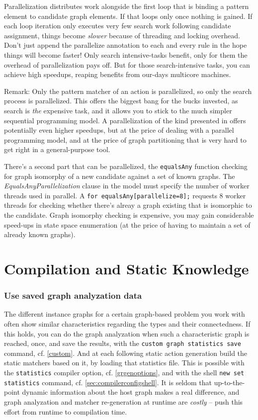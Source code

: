 Parallelization distributes work alongside the first loop that is binding a pattern element to candidate graph elements.
If that loops only once nothing is gained.
If each loop iteration only executes very few search work following candidate assignment,
things become \emph{slower} because of threading and locking overhead.
Don't just append the parallelize annotation to each and every rule in the hope things will become faster!
Only search intensive-tasks benefit, only for them the overhead of parallelization pays off.
But for those search-intensive tasks, you can achieve high speedups, reaping benefits from our-days multicore machines. 

Remark: Only the pattern matcher of an action is parallelized, so only the search process is parallelized.
This offers the biggest bang for the bucks invested, as search is \emph{the} expensive task, and it allows you to stick to the much simpler sequential programming model.
A parallelization of the kind presented in \cite{ParGraErs} offers potentially even higher speedups, but at the price of dealing with a parallel programming model, and at the price of graph partitioning that is very hard to get right in a general-purpose tool.

There's a second part that can be parallelized, the \texttt{equalsAny} function checking for graph isomorphy of a new candidate against a set of known graphs.
The \emph{EqualsAnyParallelization} clause in the model must specify the number of worker threads used in parallel.
A \verb#for equalsAny[parallelize=8];# requests 8 worker threads for checking whether there's alreay a graph existing that is isomorphic to the candidate.
Graph isomorphy checking is expensive, you may gain considerable speed-ups in state space enumeration (at the price of having to maintain a set of already known graphs).

\section{Compilation and Static Knowledge}

\subsubsection*{Use saved graph analyzation data}
The different instance graphs for a certain graph-based problem you work with often show similar characteristics regarding the types and their connectedness.
If this holds, you can do the graph analyzation when such a characteristic graph is reached, once, and save the results,
with the \texttt{custom graph statistics save} command, cf. \ref{custom}.
And at each following static action generation build the static matchers based on it, by loading that statistics file. 
This is possible with the \texttt{statistics} compiler option, cf. \ref{grgenoptions},
and with the shell \texttt{new set statistics} command, cf. \ref{sec:compilerconfigshell}. 
It is seldom that up-to-the-point dynamic information about the host graph makes a real difference,
and graph analyzation and matcher re-generation at runtime are \emph{costly} -- push this effort from runtime to compilation time.

